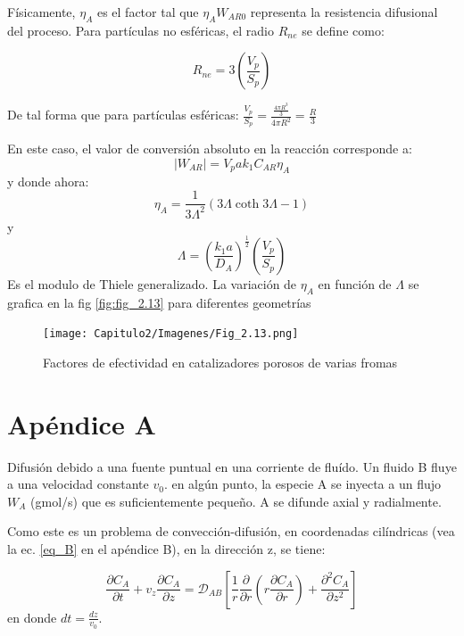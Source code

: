 Físicamente, $\eta_A$ es el factor tal que $\eta_AW_{AR0}$ representa la resistencia difusional del proceso. Para partículas no esféricas, el radio $R_{n e}$ se define como:

\begin{equation}
    R_{ne}=3\left(\frac{V_p}{S_p}\right)
\end{equation}

De tal forma que para partículas esféricas: $\frac{V_p}{S_p}=\frac{\frac{4\pi R^3}{3}}{4\pi R^2}=\frac{R}{3}$

En este caso, el valor de conversión absoluto en la reacción corresponde a:
\begin{equation*}
    |W_{AR}|=V_pak_1C_{AR}\eta_A
\end{equation*}
y donde ahora:
\begin{equation}
    \eta_A=\frac{1}{3\Lambda^2}(3\Lambda \coth 3\Lambda-1)
\end{equation} 
y
\begin{equation}
    \Lambda=(\frac{k_1a}{D_A})^{\frac{1}{2}}(\frac{V_p}{S_p})
\end{equation}
Es el modulo de Thiele generalizado. La variación de $\eta_A$ en función de $\Lambda$ se grafica en la fig \eqref{fig:fig_2.13} para diferentes geometrías

\begin{figure}[H]
    \centering
    \texttt{[image: Capitulo2/Imagenes/Fig\_2.13.png]}
    \caption{Factores de efectividad en catalizadores porosos de varias fromas}
    \label{fig:fig_2.13}
\end{figure}
\newpage
\section*{Apéndice A}
\begingroup
\renewcommand{\thefigure}{A.\arabic{figure}}
\setcounter{figure}{0}
\renewcommand{\theequation}{A.\arabic{equation}} 
\setcounter{equation}{0}
Difusión debido a una fuente puntual en una corriente de fluído.
Un fluido B fluye a una velocidad constante $v_0$. en algún punto, la especie A se inyecta a un flujo $W_A$ (gmol/s) que es suficientemente pequeño. A se difunde axial y radialmente.

Como este es un problema de convección-difusión, en coordenadas cilíndricas (vea la ec. \eqref{eq_B} en el apéndice B), en la dirección z, se tiene:

\begin{equation}
    \frac{\partial C_A}{\partial t}+v_z\frac{\partial C_A}{\partial z}=\mathscr{D}_{AB}\left[\frac{1}{r}\frac{\partial }{\partial r}\left(r\frac{\partial C_A}{\partial r}\right)+\frac{\partial ^2C_A}{\partial z^2}\right]
\end{equation}
en donde $dt=\frac{dz}{v_0}$.

